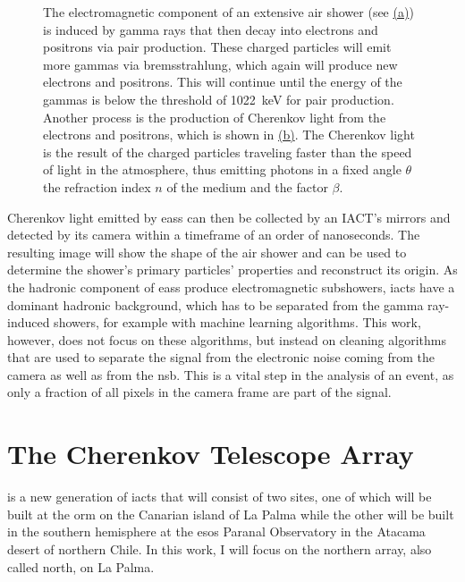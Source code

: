 \begin{figure}
\begin{subfigure}[t]{0.45\textwidth}
        \label{fig:cherenkov}
    \end{subfigure}
    \caption{The electromagnetic component of an extensive air shower (see \hyperref[fig:heitler_model]{(a)})
    is induced by gamma rays that then decay into electrons and positrons via pair production.
    These charged particles will emit more gammas via bremsstrahlung, which again will produce
    new electrons and positrons. This will continue until \eg the energy of the gammas is below
    the threshold of \SI{1022}{\kilo\eV} for pair production. Another process is the production of
    Cherenkov light from the electrons and positrons, which is shown in \hyperref[fig:cherenkov]{(b)}.
    The Cherenkov light is the result of the charged particles traveling faster than the speed of light
    in the atmosphere, thus emitting photons in a fixed angle \(\theta\) \wrt the refraction index
    \(n\) of the medium and the factor \(\beta\).}
    \label{fig:cherenkov_heitler}
\end{figure}

Cherenkov light emitted by \glspl{eas} can then be collected by an IACT's mirrors and detected by
its camera within a timeframe of an order of nanoseconds. The resulting image will show the shape
of the air shower and can be used to determine the shower's primary particles' properties and
reconstruct its origin. As the hadronic component of \glspl{eas} produce
electromagnetic subshowers, \glspl{iact} have a dominant hadronic background, which has to be
separated from the gamma ray-induced showers, for example with
machine learning algorithms. This work, however, does not focus on these algorithms, but instead
on cleaning algorithms that are used to separate the signal from the electronic noise coming from the
camera as well as from the \gls{nsb}. This is a vital step in the analysis of an event, as only a
fraction of all pixels in the camera frame are part of the signal.


\section{The Cherenkov Telescope Array}
\label{sec:cta}

\cta{} is a new generation of \glspl{iact} that will consist of two sites,
one of which will be built at the \gls{orm} on the Canarian island of La Palma while the other
will be built in the southern hemisphere at the \glspl{eso} Paranal Observatory in the Atacama desert
of northern Chile. In this work, I will focus on the northern array, also called \cta{} north,
on La Palma.

